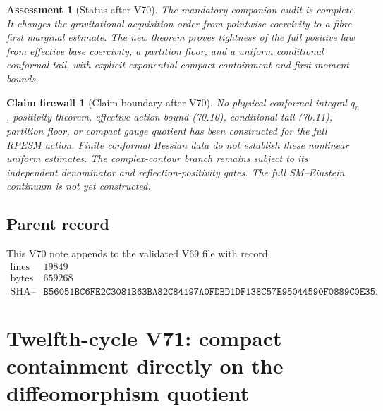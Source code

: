 \documentclass[11pt]{article}
\newtheorem{firewall}[theorem]{Claim firewall}
\newtheorem{assessment}[theorem]{Assessment}
\theoremstyle{remark}
\begin{document}
\begin{assessment}[Status after V70]
\label{ass:v12v70-status}
The mandatory companion audit is complete.  It changes the
gravitational acquisition order from pointwise coercivity to a
fibre-first marginal estimate.  The new theorem proves tightness of
the full positive law from effective base coercivity, a partition
floor, and a uniform conditional conformal tail, with explicit
exponential compact-containment and first-moment bounds.
\end{assessment}

\begin{firewall}[Claim boundary after V70]
\label{fire:v12v70-claim}
No physical conformal integral \(q_n\), positivity theorem,
effective-action bound (70.10), conditional tail (70.11), partition
floor, or compact gauge quotient has been constructed for the full
RPESM action.  Finite conformal Hessian data do not establish these
nonlinear uniform estimates.  The complex-contour branch remains
subject to its independent denominator and reflection-positivity
gates.  The full SM--Einstein continuum is not yet constructed.
\end{firewall}

\subsection{Parent record}

This V70 note appends to the validated V69 file with record
\[
\begin{array}{c|c}
\text{lines}&19849\\
\text{bytes}&659268\\
\text{SHA--256}&
\texttt{B56051BC6FE2C3081B63BA82C84197A0FDBD1DF138C57E95044590F0889C0E35}.
\end{array}
\]



\section{Twelfth-cycle V71: compact containment directly on the
diffeomorphism quotient}
\label{sec:v12v71}
\end{document}

